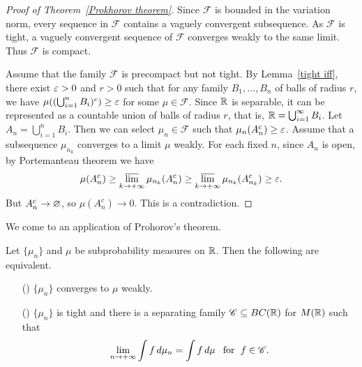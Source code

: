 \begin{proof}[Proof of Theorem~\ref{Prokhorov theorem}]
Since $\mathscr{F}$ is bounded in the variation norm, every sequence in $\mathscr{F}$ contains a vaguely convergent subsequence. As $\mathscr{F}$ is tight, a vaguely convergent sequence of $\mathscr{F}$ converges weakly to the same limit. Thus $\mathscr{F}$ is compact.\par
Assume that the family $\mathscr{F}$ is precompact but not tight. By Lemma~\ref{tight iff}, there exist $\varepsilon>0$ and $r>0$ such that for any family $B_1,\dots,B_n$ of balls of radius $r$, we have $\mu((\bigcup_{i=1}^{n}B_i)^c)\geq\varepsilon$ for some $\mu\in\mathscr{F}$. Since $\mathbb{R}$ is separable, it can be represented as a countable union of balls of radius $r$, that is, $\mathbb{R}=\bigcup_{i=1}^{\infty}B_i$. Let $A_n=\bigcup_{i=1}^{n}B_i$. Then we can select $\mu_n\in\mathscr{F}$ such that $\mu_n(A_n^c)\geq\varepsilon$. Assume that a subsequence $\mu_{n_k}$ converges to a limit $\mu$ weakly. For each fixed $n$, since $A_n$ is open, by Portemanteau theorem we have
\[\mu(A_n^c)\geq\varlimsup_{k\to+\infty}\mu_{n_k}(A_{n}^c)\geq\varlimsup_{k\to+\infty}\mu_{n_k}(A_{n_k}^c)\geq\varepsilon.\]
But $A_n^c\to\varnothing$, so $\mu(A_n^c)\to 0$. This is a contradiction.
\end{proof}
We come to an application of Prohorov's theorem.
\begin{theorem}\label{weak iff tight and converge on separating family}
Let $\{\mu_n\}$ and $\mu$ be subprobability measures on $\mathbb{R}$. Then the following are equivalent.
\begin{itemize}
\item[(\rmnum{1})] $\{\mu_n\}$ converges to $\mu$ weakly.
\item[(\rmnum{2})] $\{\mu_n\}$ is tight and there is a separating family $\mathscr{C}\subseteq BC(\mathbb{R})$ for $M(\mathbb{R})$ such that
\begin{align}\label{weak iff tight and converge on separating family-1}
\lim_{n\to+\infty}\int f\,d\mu_n=\int f\,d\mu\hspace{8pt}\text{for}\hspace{6pt} f\in\mathscr{C}.
\end{align}
\end{itemize}
\end{theorem}
